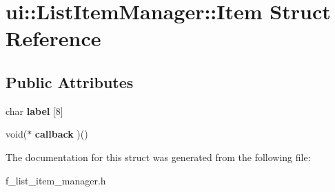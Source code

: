 \hypertarget{structui_1_1_list_item_manager_1_1_item}{}\section{ui\+::List\+Item\+Manager\+::Item Struct Reference}
\label{structui_1_1_list_item_manager_1_1_item}
\subsection*{Public Attributes}
\begin{DoxyCompactItemize}
\item 
\mbox{\label{structui_1_1_list_item_manager_1_1_item_a08f419234404887b0d5835cee661f952}} 
char {\bfseries label} \mbox{[}8\mbox{]}
\item 
\mbox{\label{structui_1_1_list_item_manager_1_1_item_ab046185e2e3448ce47f4ba4c40a3acdf}} 
void($\ast$ {\bfseries callback} )()
\end{DoxyCompactItemize}


The documentation for this struct was generated from the following file\+:\begin{DoxyCompactItemize}
\item 
f\+\_\+list\+\_\+item\+\_\+manager.\+h\end{DoxyCompactItemize}
